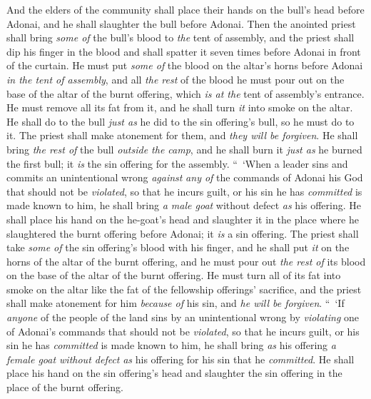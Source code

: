 \begin{biblechapter}
\verse And the elders of the community shall place their hands on the bull’s head before Adonai, and he shall slaughter the bull before Adonai.
\verse Then the anointed priest shall bring \textit{some of} the bull’s blood to \textit{the} tent of assembly,
\verse and the priest shall dip his finger in the blood and shall spatter it seven times before Adonai in front of the curtain.
\verse He must put \textit{some of} the blood on the altar’s horns before Adonai \textit{in the tent of assembly}, and all \textit{the rest} of the blood he must pour out on the base of the altar of the burnt offering, which \textit{is at the} tent of assembly’s entrance.
\verse He must remove all its fat from it, and he shall turn \textit{it} into smoke on the altar.
\verse He shall do to the bull \textit{just as} he did to the sin offering’s bull, so he must do to it. The priest shall make atonement for them, and \textit{they will be forgiven}.
\verse He shall bring \textit{the rest of} the bull \textit{outside the camp}, and he shall burn it \textit{just as} he burned the first bull; it \textit{is} the sin offering for the assembly.
\verse “ ‘When a leader sins and commits an unintentional wrong \textit{against} \textit{any of} the commands of Adonai his God that should not be \textit{violated}, so that he incurs guilt,
\verse or his sin he has \textit{committed} is made known to him, he shall bring \textit{a male goat} without defect \textit{as} his offering.
\verse He shall place his hand on the he-goat’s head and slaughter it in the place where he slaughtered the burnt offering before Adonai; it \textit{is} a sin offering.
\verse The priest shall take \textit{some of} the sin offering’s blood with his finger, and he shall put \textit{it} on the horns of the altar of the burnt offering, and he must pour out \textit{the rest of} its blood on the base of the altar of the burnt offering.
\verse He must turn all of its fat into smoke on the altar like the fat of the fellowship offerings’ sacrifice, and the priest shall make atonement for him \textit{because of} his sin, and \textit{he will be forgiven}.
\verse “ ‘If \textit{anyone} of the people of the land sins by an unintentional wrong by \textit{violating} one of Adonai’s commands that should not be \textit{violated}, so that he incurs guilt,
\verse or his sin he has \textit{committed} is made known to him, he shall bring \textit{as} his offering \textit{a female goat without defect} \textit{as} his offering for his sin that he \textit{committed}.
\verse He shall place his hand on the sin offering’s head and slaughter the sin offering in the place of the burnt offering.

\end{biblechapter}
